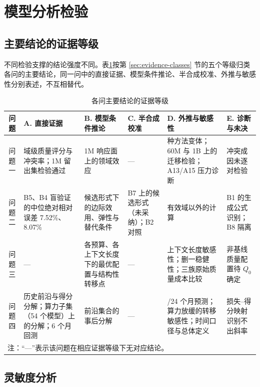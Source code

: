 \section{模型分析检验}

\subsection{主要结论的证据等级}

不同检验支撑的结论强度不同。表\ref{tab:evidence}按第 \ref{sec:evidence-classes} 节的五个等级归类
各问的主要结论，同一问中的直接证据、模型条件推论、半合成校准、外推与敏感性分别表述，不互相替代。

\begin{table}[htbp]
  \centering
  \caption{各问主要结论的证据等级}
  \label{tab:evidence}
  \small
  \setlength{\tabcolsep}{4pt}
  \begin{tabular}{c>{\raggedright\arraybackslash}p{2.72cm}>{\raggedright\arraybackslash}p{2.72cm}%
                  >{\raggedright\arraybackslash}p{2.35cm}>{\raggedright\arraybackslash}p{2.95cm}%
                  >{\raggedright\arraybackslash}p{2.55cm}}
    \toprule
    问题 & A. 直接证据 & B. 模型条件推论 & C. 半合成校准 & D. 外推与敏感性 & E. 诊断与未决 \\
    \midrule
    问题一 & 域级质量评分与冲突率；1M 留出集检验通过 & 1M 响应面上的领域效应 & --- & 11 种方法变体；60M 与 1B 上的迁移检验；A13/A15 压力诊断 & 冲突成因未逐对检验 \\
    \addlinespace
    问题二 & B5、B4 盲验证的中位绝对相对误差 7.52\%、8.07\% & 候选形式下的边际效用、弹性与替代条件 & B7 上的候选形式（未采纳）；B2 对照 & 有效域以外的计算 & B1 的生成公式识别；B8 隔离 \\
    \addlinespace
    问题三 & --- & 各预算、各上下文长度下的最优配置与结构性转移点 & --- & 上下文长度敏感性；删一稳健性；三族原始质量成本比较 & 非基线质量配置待 $Q_0$ 确定 \\
    \addlinespace
    问题四 & 历史前沿与得分分解；算力子集（54 个模型）上的分解；6 个月回测 & 前沿集合的事后分解 & --- & 12/24 个月预测；算力放缓的转移敏感性；时间口径与总体定义 & 损失–得分映射识别不出斜率 \\
    \bottomrule
    \multicolumn{6}{l}{\footnotesize 注：“---”表示该问题在相应证据等级下无对应结论。} \\
  \end{tabular}
\end{table}

\subsection{灵敏度分析}


